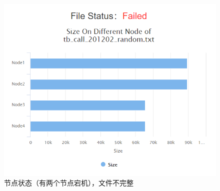 \documentclass[12pt,a4paper]{article}
\begin{document}
\begin{figure}[htb]
\centering
\includegraphics[width=14cm]{node_5}
\caption{节点状态（有两个节点宕机），文件不完整 \label{node_5}}
\end{figure}
\end{document}
